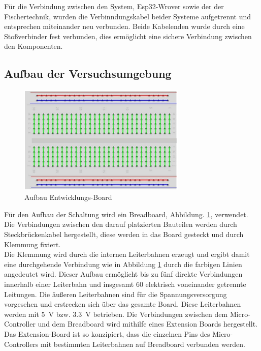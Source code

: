 \documentclass[conference,compsoc,final,a4paper]{IEEEtran}
\begin{document}
Für die Verbindung zwischen den System, Esp32-Wrover sowie der der Fischertechnik, wurden die Verbinndungskabel beider Systeme aufgetrennt und entsprechen miteinander neu verbunden.
Beide Kabelenden wurde durch eine Stoßverbinder fest verbunden, dies ermöglicht eine sichere Verbindung zwischen den Komponenten.

\subsection{Aufbau der Versuchsumgebung}
\begin{figure}[h]
\centering
\includegraphics[width=8cm]{../images/board.png}
\caption{Aufbau Entwicklungs-Board \autocite{freenoveTutorial}}\label{Elektrik:DevBoard}
\end{figure}


Für den Aufbau der Schaltung wird ein Breadboard, Abbildung. \ref{Elektrik:DevBoard}, verwendet. Die Verbindungen zwischen den darauf platzierten Bauteilen werden durch Steckbrückenkabel hergestellt, diese werden in das Board gesteckt und durch Klemmung fixiert.
\\

\noindent Die Klemmung wird durch die internen Leiterbahnen erzeugt und ergibt damit eine durchgehende Verbindung wie in Abbildung \ref{Elektrik:DevBoard} durch die farbigen Linien angedeutet wird. 
Dieser Aufbau ermöglicht bis zu fünf direkte Verbindungen innerhalb einer Leiterbahn und insgesamt 60 elektrisch voneinander getrennte Leitungen.
Die äußeren Leiterbahnen sind für die Spannungsversorgung vorgesehen und erstrecken sich über das gesamte Board. Diese Leiterbahnen werden mit \qty{5}{V} bzw. \qty{3,3}{V} betrieben.
Die Verbindungen zwischen dem Micro-Controller und dem Breadboard wird mithilfe eines Extension Boards hergestellt. Das Extension-Board ist so konzipiert, 
dass die einzelnen Pins des Micro-Controllers mit bestimmten Leiterbahnen auf Breadboard verbunden werden.
\\
\end{document}
